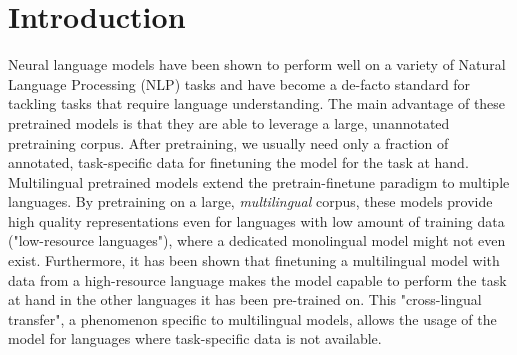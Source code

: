 
\chapter{Introduction}
\label{chap:introduction}





Neural language models have been shown to perform well on a variety of Natural Language Processing (NLP) tasks and have become a de-facto standard for tackling tasks that require language understanding. The main advantage of these pretrained models is that they are able to leverage a large, unannotated pretraining corpus. After pretraining, we usually need only a fraction of annotated, task-specific data for finetuning the model for the task at hand. \cite{devlin_bert_2019,radford_improving_2018} Multilingual pretrained models extend the pretrain-finetune paradigm to multiple languages. By pretraining on a large, \textit{multilingual} corpus, these models provide high quality representations even for languages with low amount of training data ("low-resource languages"), where a dedicated monolingual model might not even exist. Furthermore, it has been shown that finetuning a multilingual model with data from a high-resource language makes the model capable to perform the task at hand in the other languages it has been pre-trained on. This "cross-lingual transfer", a phenomenon specific to multilingual models, allows the usage of the model for languages where task-specific data is not available. \cite{k_cross-lingual_2022,conneau_unsupervised_2020-1}

